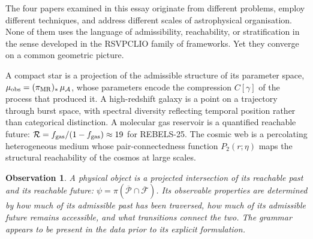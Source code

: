 \documentclass[12pt, oneside]{article}
\newtheorem{observation}{Observation}
\begin{document}
The four papers examined in this essay originate from different problems, employ different techniques, and address different scales of astrophysical organisation. None of them uses the language of admissibility, reachability, or stratification in the sense developed in the RSVP\/CLIO family of frameworks. Yet they converge on a common geometric picture.

A compact star is a projection of the admissible structure of its parameter space, $\mu_{\rm obs} = (\pi_{\rm MR})_*\,\mu_{\mathcal{A}}$, whose parameters encode the compression $C[\gamma]$ of the process that produced it. A high-redshift galaxy is a point on a trajectory through burst space, with spectral diversity reflecting temporal position rather than categorical distinction. A molecular gas reservoir is a quantified reachable future: $\mathcal{R} = f_{\rm gas}/(1-f_{\rm gas}) \approx 19$ for REBELS-25. The cosmic web is a percolating heterogeneous medium whose pair-connectedness function $P_2(r;\eta)$ maps the structural reachability of the cosmos at large scales.

\begin{observation}
A physical object is a projected intersection of its reachable past and its reachable future: $\psi = \pi\!\left(\overline{\mathcal{P}} \cap \overline{\mathcal{F}}\right)$. Its observable properties are determined by how much of its admissible past has been traversed, how much of its admissible future remains accessible, and what transitions connect the two. The grammar appears to be present in the data prior to its explicit formulation.
\end{observation}
\end{document}
